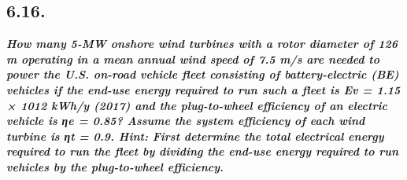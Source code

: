 \documentclass[
  letterpaper,
  DIV=11,
  numbers=noendperiod]{scrartcl}
\begin{document}
\hypertarget{section-6}{%
\subsection{6.16.}\label{section-6}}

\textbf{\emph{How many 5-MW onshore wind turbines with a rotor diameter
of 126 m operating in a mean annual wind speed of 7.5 m/s are needed to
power the U.S. on-road vehicle fleet consisting of battery-electric (BE)
vehicles if the end-use energy required to run such a fleet is Ev = 1.15
× 1012 kWh/y (2017) and the plug-to-wheel efficiency of an electric
vehicle is ηe = 0.85? Assume the system efficiency of each wind turbine
is ηt = 0.9. Hint: First determine the total electrical energy required
to run the fleet by dividing the end-use energy required to run vehicles
by the plug-to-wheel efficiency.}}
\end{document}
